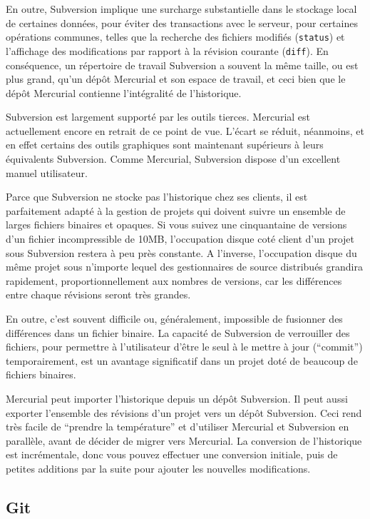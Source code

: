 En outre, Subversion implique une surcharge substantielle dans le stockage local
de certaines données, pour éviter des transactions avec le serveur, pour 
certaines opérations communes, telles que la recherche des fichiers modifiés
(\texttt{status}) et l'affichage des modifications par rapport à la révision 
courante (\texttt{diff}). En conséquence, un répertoire de travail Subversion
a souvent la même taille, ou est plus grand, qu'un dépôt Mercurial et son
espace de travail, et ceci bien que le dépôt Mercurial contienne l'intégralité 
de l'historique.

Subversion est largement supporté par les outils tierces. Mercurial est
actuellement encore en retrait de ce point de vue. L'écart se réduit, néanmoins,
et en effet certains des outils graphiques sont maintenant supérieurs à leurs
équivalents Subversion. Comme Mercurial, Subversion dispose d'un excellent
manuel utilisateur.

Parce que Subversion ne stocke pas l'historique chez ses clients, il est 
parfaitement adapté à la gestion de projets qui doivent suivre un ensemble
de larges fichiers binaires et opaques. Si vous suivez une cinquantaine de
versions d'un fichier incompressible de 10MB, l'occupation disque coté client
d'un projet sous Subversion restera à peu près constante. A l'inverse, 
l'occupation disque du même projet sous n'importe lequel des gestionnaires
de source distribués grandira rapidement, proportionnellement aux nombres
de versions, car les différences entre chaque révisions seront très grandes.

En outre, c'est souvent difficile ou, généralement, impossible de fusionner
des différences dans un fichier binaire. La capacité de Subversion de 
verrouiller des fichiers, pour permettre à l'utilisateur d'être le seul
à le mettre à jour (``commit'') temporairement, est un avantage significatif
dans un projet doté de beaucoup de fichiers binaires.

Mercurial peut importer l'historique depuis un dépôt Subversion. Il peut
aussi exporter l'ensemble des révisions d'un projet vers un dépôt Subversion.
Ceci rend très facile de ``prendre la température'' et d'utiliser Mercurial et Subversion
en parallèle, avant de décider de migrer vers Mercurial. La conversion de 
l'historique est incrémentale, donc vous pouvez effectuer une conversion 
initiale, puis de petites additions par la suite pour ajouter les nouvelles
modifications.

\subsection{Git}


